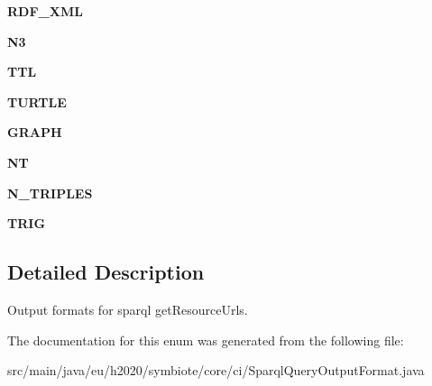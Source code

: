 \begin{DoxyCompactItemize}
{\bfseries R\+D\+F\+\_\+\+X\+ML}
\item 
\mbox{\label{enumeu_1_1h2020_1_1symbiote_1_1core_1_1ci_1_1SparqlQueryOutputFormat_ae3a9e9116533efcac0c1f508ce39e978}} 
{\bfseries N3}
\item 
\mbox{\label{enumeu_1_1h2020_1_1symbiote_1_1core_1_1ci_1_1SparqlQueryOutputFormat_a55d94700d43b2dff1e8a31d1ba1e9973}} 
{\bfseries T\+TL}
\item 
\mbox{\label{enumeu_1_1h2020_1_1symbiote_1_1core_1_1ci_1_1SparqlQueryOutputFormat_aae48395ebfb91866c00963b9720eae3e}} 
{\bfseries T\+U\+R\+T\+LE}
\item 
\mbox{\label{enumeu_1_1h2020_1_1symbiote_1_1core_1_1ci_1_1SparqlQueryOutputFormat_ac7e789c1b3fe28d08d9366c44563abd2}} 
{\bfseries G\+R\+A\+PH}
\item 
\mbox{\label{enumeu_1_1h2020_1_1symbiote_1_1core_1_1ci_1_1SparqlQueryOutputFormat_a6e3ac3d8eb6190c93b9f2df23f8bbcf9}} 
{\bfseries NT}
\item 
\mbox{\label{enumeu_1_1h2020_1_1symbiote_1_1core_1_1ci_1_1SparqlQueryOutputFormat_aff0807696ba2a132e9e2c46a6ac86204}} 
{\bfseries N\+\_\+\+T\+R\+I\+P\+L\+ES}
\item 
\mbox{\label{enumeu_1_1h2020_1_1symbiote_1_1core_1_1ci_1_1SparqlQueryOutputFormat_abf6e13d5a20dfee8902dc8472bdd5b0b}} 
{\bfseries T\+R\+IG}
\end{DoxyCompactItemize}


\subsection{Detailed Description}
Output formats for sparql get\+Resource\+Urls. 

The documentation for this enum was generated from the following file\+:\begin{DoxyCompactItemize}
\item 
src/main/java/eu/h2020/symbiote/core/ci/Sparql\+Query\+Output\+Format.\+java\end{DoxyCompactItemize}
